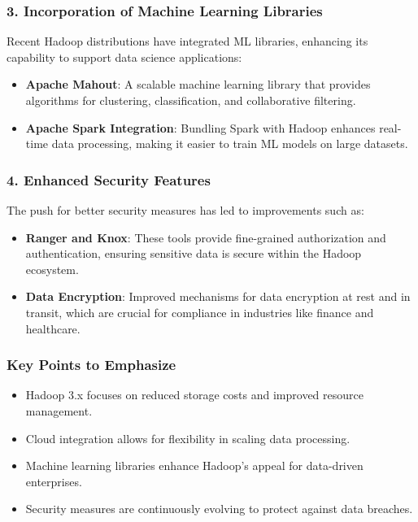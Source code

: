 \documentclass[aspectratio=169]{beamer}
\begin{document}
\begin{frame}[fragile]
    \frametitle{3. Incorporation of Machine Learning Libraries}
    Recent Hadoop distributions have integrated ML libraries, enhancing its capability to support data science applications:
    \begin{itemize}
        \item \textbf{Apache Mahout}: A scalable machine learning library that provides algorithms for clustering, classification, and collaborative filtering.
        
        \item \textbf{Apache Spark Integration}: Bundling Spark with Hadoop enhances real-time data processing, making it easier to train ML models on large datasets.
    \end{itemize}
\end{frame}

\begin{frame}[fragile]
    \frametitle{4. Enhanced Security Features}
    The push for better security measures has led to improvements such as:
    \begin{itemize}
        \item \textbf{Ranger and Knox}: These tools provide fine-grained authorization and authentication, ensuring sensitive data is secure within the Hadoop ecosystem.
        
        \item \textbf{Data Encryption}: Improved mechanisms for data encryption at rest and in transit, which are crucial for compliance in industries like finance and healthcare.
    \end{itemize}
\end{frame}

\begin{frame}[fragile]
    \frametitle{Key Points to Emphasize}
    \begin{itemize}
        \item Hadoop 3.x focuses on reduced storage costs and improved resource management.
        \item Cloud integration allows for flexibility in scaling data processing.
        \item Machine learning libraries enhance Hadoop's appeal for data-driven enterprises.
        \item Security measures are continuously evolving to protect against data breaches.
    \end{itemize}
\end{frame}
\end{document}
